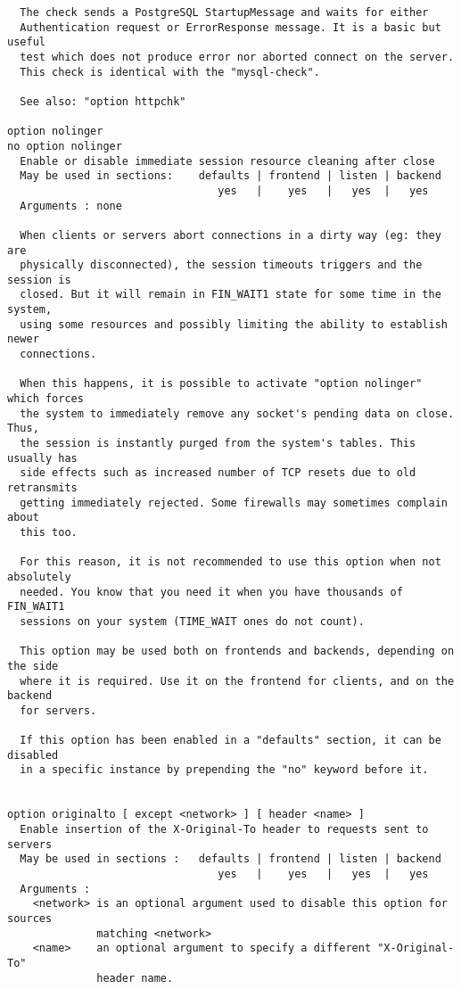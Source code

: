 \begin{verbatim}
  The check sends a PostgreSQL StartupMessage and waits for either
  Authentication request or ErrorResponse message. It is a basic but useful
  test which does not produce error nor aborted connect on the server.
  This check is identical with the "mysql-check".

  See also: "option httpchk"

option nolinger
no option nolinger
  Enable or disable immediate session resource cleaning after close
  May be used in sections:    defaults | frontend | listen | backend
                                 yes   |    yes   |   yes  |   yes
  Arguments : none

  When clients or servers abort connections in a dirty way (eg: they are
  physically disconnected), the session timeouts triggers and the session is
  closed. But it will remain in FIN_WAIT1 state for some time in the system,
  using some resources and possibly limiting the ability to establish newer
  connections.

  When this happens, it is possible to activate "option nolinger" which forces
  the system to immediately remove any socket's pending data on close. Thus,
  the session is instantly purged from the system's tables. This usually has
  side effects such as increased number of TCP resets due to old retransmits
  getting immediately rejected. Some firewalls may sometimes complain about
  this too.

  For this reason, it is not recommended to use this option when not absolutely
  needed. You know that you need it when you have thousands of FIN_WAIT1
  sessions on your system (TIME_WAIT ones do not count).

  This option may be used both on frontends and backends, depending on the side
  where it is required. Use it on the frontend for clients, and on the backend
  for servers.

  If this option has been enabled in a "defaults" section, it can be disabled
  in a specific instance by prepending the "no" keyword before it.


option originalto [ except <network> ] [ header <name> ]
  Enable insertion of the X-Original-To header to requests sent to servers
  May be used in sections :   defaults | frontend | listen | backend
                                 yes   |    yes   |   yes  |   yes
  Arguments :
    <network> is an optional argument used to disable this option for sources
              matching <network>
    <name>    an optional argument to specify a different "X-Original-To"
              header name.


\end{verbatim}
